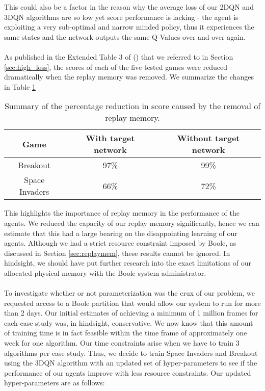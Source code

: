 This could also be a factor in the reason why the average loss of our 2DQN and 3DQN algorithms are so low yet score performance is lacking - the agent is exploiting a very sub-optimal and narrow minded policy, thus it experiences the same states and the network outputs the same Q-Values over and over again. \paragraph{}

As published in the Extended Table 3 of (\citet{human}) that we referred to in Section \ref{sec:high_loss}, the scores of each of the five tested games were reduced dramatically when the replay memory was removed. We summarize the changes in Table \ref{table:replaymem}

\begin{table}[H]
	\centering
	\begin{tabular}{|c|c|c|}
		\hline
		Game           & With target network & Without target network \\
		\hline
		\hline
		Breakout       & 97\%                & 99\%                   \\
		\hline
		Space Invaders & 66\%                & 72\%                   \\
		\hline
	\end{tabular}
	\caption{Summary of the percentage reduction in score caused by the removal of replay memory.}
	\label{table:replaymem}
\end{table}

This highlights the importance of replay memory in the performance of the agents. We reduced the capacity of our replay memory significantly, hence we can estimate that this had a large bearing on the disappointing learning of our agents. Although we had a strict resource constraint imposed by Boole, as discussed in Section \ref{sec:replaymem}, these results cannot be ignored. In hindsight, we should have put further research into the exact limitations of our allocated physical memory with the Boole system administrator. \paragraph{}

To investigate whether or not parameterization was the crux of our problem, we requested access to a Boole partition that would allow our system to run for more than 2 days. Our initial estimates of achieving a minimum of 1 million frames for each case study was, in hindsight, conservative. We now know that this amount of training time is in fact feasible within the time frame of approximately one week for one algorithm. Our time constraints arise when we have to train 3 algorithms per case study. Thus, we decide to train Space Invaders and Breakout using the 3DQN algorithm with an updated set of hyper-parameters to see if the performance of our agents improve with less resource constraints. Our updated hyper-parameters are as follows:

